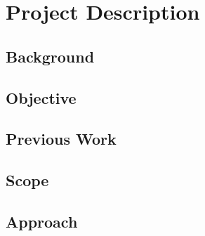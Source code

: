  
\section{Project Description}
\label{intro:project_description}


\subsection{Background}
\label{intro:background}

\subsection{Objective} 
\label{intro:objective}

\subsection{Previous Work}
\label{intro:previous_work}

\subsection{Scope}
\label{intro:scope}

\subsection{Approach}
\label{intro:approach}